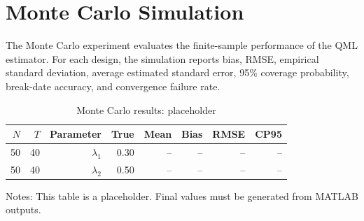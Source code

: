\section{Monte Carlo Simulation}\label{sec:monte-carlo}

The Monte Carlo experiment evaluates the finite-sample performance of the QML estimator. For each design, the simulation reports bias, RMSE, empirical standard deviation, average estimated standard error, 95\% coverage probability, break-date accuracy, and convergence failure rate.

\begin{table}[htbp]
\centering
\caption{Monte Carlo results: placeholder}
\label{tab:mc-baseline}
\begin{threeparttable}
\begin{tabular}{rrrrrrrr}
\toprule
$N$ & $T$ & Parameter & True & Mean & Bias & RMSE & CP95 \\
\midrule
50 & 40 & $\lambda_1$ & 0.30 & -- & -- & -- & -- \\
50 & 40 & $\lambda_2$ & 0.50 & -- & -- & -- & -- \\
\bottomrule
\end{tabular}
\begin{tablenotes}
\small
\item Notes: This table is a placeholder. Final values must be generated from MATLAB outputs.
\end{tablenotes}
\end{threeparttable}
\end{table}


